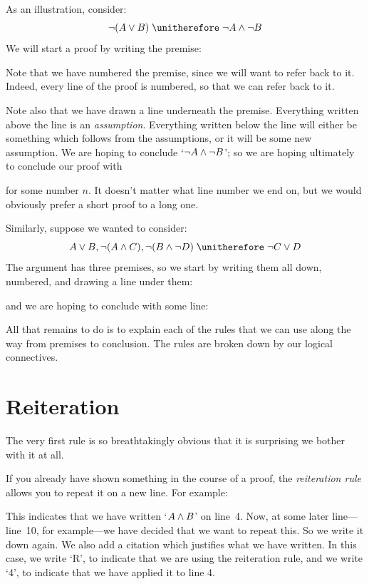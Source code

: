 As an illustration, consider:
	$$\enot (A \eor B) \therefore \enot A \eand \enot B$$
We will start a proof by writing the premise:
\begin{fitchproof}
	\PR
\end{fitchproof}
Note that we have numbered the premise, since we will want to refer back to it. Indeed, every line of the proof is numbered, so that we can refer back to it.

Note also that we have drawn a line underneath the premise. Everything written above the line is an \emph{assumption}. Everything written below the line will either be something which follows from the assumptions, or it will be some new assumption. We are hoping to conclude `$\neg A \wedge \neg B$'; so we are hoping ultimately to conclude our proof with
\begin{fitchproof}
\end{fitchproof}
for some number $n$. It doesn't matter what line number we end on, but we would obviously prefer a short proof to a long one.

Similarly, suppose we wanted to consider:
$$A\eor B, \enot (A\eand C), \enot (B \eand \enot D) \therefore \enot C\eor D$$
The argument has three premises, so we start by writing them all down, numbered, and drawing a line under them:
\begin{fitchproof}
	\PR
	\PR
	\PR
\end{fitchproof}
and we are hoping to conclude with some line:
\begin{fitchproof}
\end{fitchproof}
All that remains to do is to explain each of the rules that we can use along the way from premises to conclusion. The rules are broken down by our logical connectives.

\section{Reiteration}
The very first rule is so breathtakingly obvious that it is surprising we bother with it at all.

If you already have shown something in the course of a proof, the \emph{reiteration rule} allows you to repeat it on a new line. For example:
\begin{fitchproof}
	\ellipsesline
	 
\end{fitchproof}
This indicates that we have written `$A \wedge B$' on line~4. Now, at some later line---line~10, for example---we have decided that we want to repeat this. So we write it down again. We also add a citation which justifies what we have written. In this case, we write `R', to indicate that we are using the reiteration rule, and we write `4', to indicate that we have applied it to line 4.

